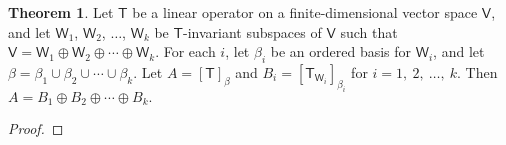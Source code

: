 \documentclass[12pt]{book}
\theoremstyle{definition}
\newtheorem{theorem}{Theorem}[chapter]
\begin{document}
	\newpage
	\begin{theorem}
		Let $\mathsf{T}$ be a linear operator on a finite-dimensional vector space $\mathsf{V}$, and let $\mathsf{W}_1$, $\mathsf{W}_2$, $\ldots$, $\mathsf{W}_k$ be $\mathsf{T}$-invariant subspaces of $\mathsf{V}$ such that $\mathsf{V}=\mathsf{W}_1\oplus\mathsf{W}_2\oplus\cdots\oplus\mathsf{W}_k.$ For each $i$, let $\beta_i$ be an ordered basis for $\mathsf{W}_i$, and let $\beta=\beta_1\cup\beta_2\cup\cdots\cup\beta_k$. Let $A=[\mathsf{T}]_\beta$ and $B_i=[\mathsf{T}_{\mathsf{W}_i}]_{\beta_i}$ for $i=1,~2,~\ldots,~k$. Then $A=B_1\oplus B_2\oplus \cdots \oplus B_k.$
	\end{theorem}
	\begin{proof}
	\end{proof}
\end{document}
